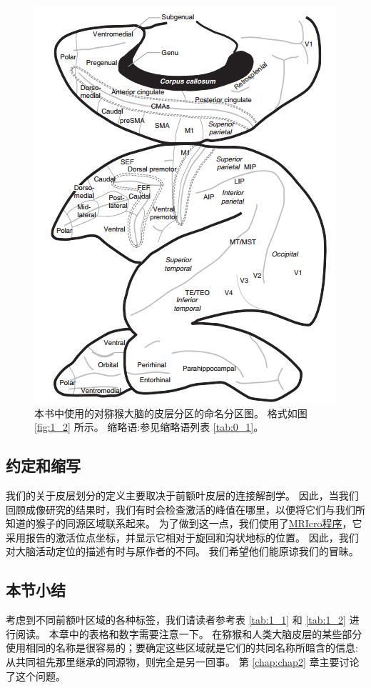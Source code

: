 \begin{figure}[!htb]
	\centering
	\includegraphics[width=0.5\linewidth]{image_pfc/Fig_1_4}
	\caption{本书中使用的对猕猴大脑的皮层分区的命名分区图。
		格式如图 \ref{fig:1_2} 所示。
		缩略语:参见缩略语列表 \ref{tab:0_1}。\label{fig:1_4}}
\end{figure}




\subsection{约定和缩写}
我们的关于皮层划分的定义主要取决于前额叶皮层的连接解剖学。
因此，当我们回顾成像研究的结果时，我们有时会检查激活的峰值在哪里，以便将它们与我们所知道的猴子的同源区域联系起来。
为了做到这一点，我们使用了\href{http://www.cabiatl.com/mricro/MRIcro/index.html}{MRIcro程序}，它采用报告的激活位点坐标，并显示它相对于旋回和沟状地标的位置。
因此，我们对大脑活动定位的描述有时与原作者的不同。
我们希望他们能原谅我们的冒昧。


\subsection{本节小结}
考虑到不同前额叶区域的各种标签，我们请读者参考表 \ref{tab:1_1} 和 \ref{tab:1_2} 进行阅读。
本章中的表格和数字需要注意一下。
在猕猴和人类大脑皮层的某些部分使用相同的名称是很容易的；要确定这些区域就是它们的共同名称所暗含的信息:从共同祖先那里继承的同源物，则完全是另一回事。
第 \ref{chap:chap2} 章主要讨论了这个问题。

